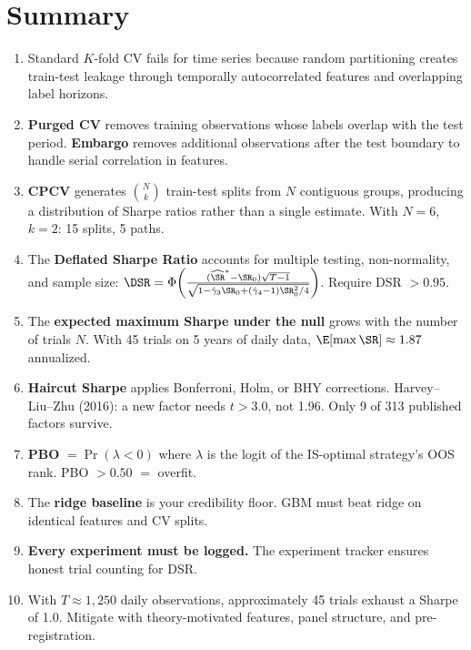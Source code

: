 \section{Summary}
\label{sec:ch11-summary}

\begin{enumerate}[nosep]
  \item Standard $K$-fold CV fails for time series because random partitioning creates train-test leakage through temporally autocorrelated features and overlapping label horizons.
  \item \textbf{Purged CV} removes training observations whose labels overlap with the test period. \textbf{Embargo} removes additional observations after the test boundary to handle serial correlation in features.
  \item \textbf{CPCV} generates $\binom{N}{k}$ train-test splits from $N$ contiguous groups, producing a distribution of Sharpe ratios rather than a single estimate. With $N = 6$, $k = 2$: 15 splits, 5 paths.
  \item The \textbf{Deflated Sharpe Ratio} accounts for multiple testing, non-normality, and sample size: $\DSR = \Phi\!\left(\frac{(\widehat{\SR}^* - \SR_0)\sqrt{T-1}}{\sqrt{1 - \hat{\gamma}_3 \SR_0 + (\hat{\gamma}_4 - 1)\SR_0^2/4}}\right)$. Require DSR $> 0.95$.
  \item The \textbf{expected maximum Sharpe under the null} grows with the number of trials $N$. With 45 trials on 5 years of daily data, $\E[\max \SR] \approx 1.87$ annualized.
  \item \textbf{Haircut Sharpe} applies Bonferroni, Holm, or BHY corrections. Harvey--Liu--Zhu (2016): a new factor needs $t > 3.0$, not 1.96. Only 9 of 313 published factors survive.
  \item \textbf{PBO} $= \Pr(\lambda < 0)$ where $\lambda$ is the logit of the IS-optimal strategy's OOS rank. PBO $> 0.50$ $=$ overfit.
  \item The \textbf{ridge baseline} is your credibility floor. GBM must beat ridge on identical features and CV splits.
  \item \textbf{Every experiment must be logged.} The experiment tracker ensures honest trial counting for DSR.
  \item With $T \approx 1{,}250$ daily observations, approximately 45 trials exhaust a Sharpe of 1.0. Mitigate with theory-motivated features, panel structure, and pre-registration.
\end{enumerate}

